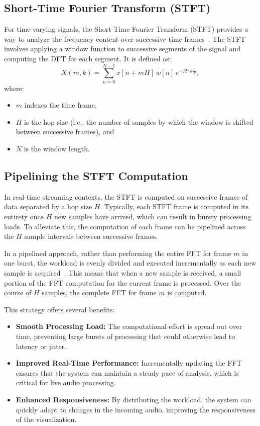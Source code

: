 \documentclass[12pt,letter]{article}
\begin{document}
\subsection{Short-Time Fourier Transform (STFT)}

For time-varying signals, the Short-Time Fourier Transform (STFT) provides a
way to analyze the frequency content over successive time
frames~\citep{allen1977short}. The STFT involves applying a window function
to successive segments of the signal and computing the DFT for each segment.
It is defined as:
\begin{equation}
X(m, k) = \sum_{n=0}^{N-1} x[n + mH] \, w[n] \, e^{-j2\pi k \frac{n}{N}},
\label{eqn:stft}
\end{equation}
where:
\begin{itemize}
  \item $m$ indexes the time frame,
  \item $H$ is the hop size (i.e., the number of samples by which the window
  is shifted between successive frames), and
  \item $N$ is the window length.
\end{itemize}

\subsection{Pipelining the STFT Computation}

In real-time streaming contexts, the STFT is computed on successive frames of
data separated by a hop size $H$. Typically, each STFT frame is computed
in its entirety once $H$ new samples have arrived, which can result in
bursty processing loads. To alleviate this, the computation of each frame can
be pipelined across the $H$ sample intervals between successive frames.

In a pipelined approach, rather than performing the entire FFT for frame
$m$ in one burst, the workload is evenly divided and executed
incrementally as each new sample is acquired~\citep{hennessy2011computer}.
This means that when a new sample is received, a small portion of the FFT
computation for the current frame is processed. Over the course of $H$
samples, the complete FFT for frame $m$ is computed.

This strategy offers several benefits:
\begin{itemize}
  \item \textbf{Smooth Processing Load:} The computational effort is spread
  out over time, preventing large bursts of processing that could otherwise
  lead to latency or jitter.
  \item \textbf{Improved Real-Time Performance:} Incrementally updating the
  FFT ensures that the system can maintain a steady pace of analysis, which
  is critical for live audio processing.
  \item \textbf{Enhanced Responsiveness:} By distributing the workload, the
  system can quickly adapt to changes in the incoming audio, improving the
  responsiveness of the visualization.
\end{itemize}
\end{document}
